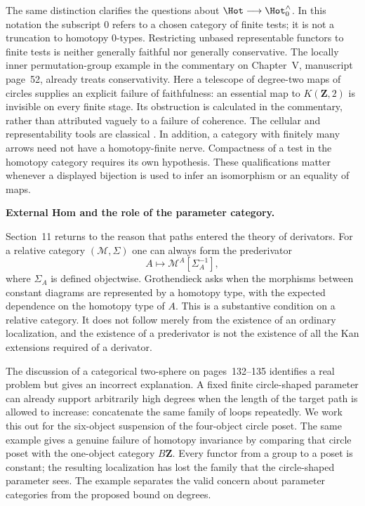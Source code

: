 The same distinction clarifies the questions about
$\Hot\longrightarrow\Hot_0^{\wedge}$.  In this notation the subscript $0$
refers to a chosen category of finite tests; it is not a truncation to
homotopy $0$-types.  Restricting unbased representable functors to finite tests
is neither generally faithful nor generally conservative.  The locally inner
permutation-group example in the commentary on Chapter~V, manuscript page~52,
already treats conservativity.  Here a telescope of degree-two maps of circles supplies an
explicit failure of faithfulness: an essential map to $K(\mathbf Z,2)$ is
invisible on every finite stage.  Its obstruction is calculated in the
commentary, rather than attributed vaguely to a failure of coherence.  The
cellular and representability tools are classical
\citep[\S3F and Theorem~4.57]{Hatcher2002}.  In addition, a category with
finitely many arrows need not have a homotopy-finite nerve.  Compactness of a
test in the homotopy category requires its own hypothesis.  These qualifications
matter whenever a displayed bijection is used to infer an isomorphism or an
equality of maps.

\medskip\noindent\textbf{External Hom and the role of the parameter category.}

Section~11 returns to the reason that paths entered the theory of derivators.
For a relative category $(\mathcal M,\Sigma)$ one can always form the
prederivator
\[
 A\longmapsto\mathcal M^A[\Sigma_A^{-1}],
\]
where $\Sigma_A$ is defined objectwise.  Grothendieck asks when the morphisms
between constant diagrams are represented by a homotopy type, with the expected
dependence on the homotopy type of $A$.  This is a substantive condition on a
relative category.  It does not follow merely from the existence of an
ordinary localization, and the existence of a prederivator is not the
existence of all the Kan extensions required of a derivator.

The discussion of a categorical two-sphere on pages~132--135 identifies a real
problem but gives an incorrect explanation.  A fixed finite circle-shaped
parameter can already support arbitrarily high degrees when the length of the
target path is allowed to increase: concatenate the same family of loops
repeatedly.  We work this out for the six-object suspension of the four-object
circle poset.  The same example gives a genuine failure of homotopy invariance
by comparing that circle poset with the one-object category $B\mathbf Z$.
Every functor from a group to a poset is constant; the resulting localization
has lost the family that the circle-shaped parameter sees.  The example
separates the valid concern about parameter categories from the proposed
bound on degrees.

